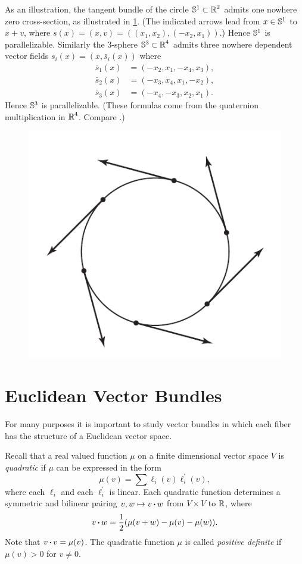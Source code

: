 As an illustration, the tangent bundle of the circle $\mathbb{S}^{1} \subset \boldsymbol{\mathbb{R}}^2$ admits
one nowhere zero cross-section, as illustrated in \cref{fig3}. (The indicated
arrows lead from $x\in\mathbb{S}^{1}$  to $x + v$, where $s(x) =
(x, v) =((x_1,x_2), (-x_2,x_1))$.)
Hence $\mathbb{S}^{1}$  is parallelizable. Similarly the $3$-sphere $\mathbb{S}^{3}\subset\boldsymbol{\mathbb{R}}^4 $ admits
three nowhere dependent vector fields $s_{i}(x)=\left(x, \bar{s}_{i}(x)\right)$ where
\begin{align*}
		\bar{s}_{1}(x)&=\left(-x_{2}, x_{1},-x_{4}, x_{3}\right), \\
		\bar{s}_{2}(x)&=\left(-x_{3}, x_{4}, x_{1},-x_{2}\right), \\
		\bar{s}_{3}(x)&=\left(-x_{4},-x_{3}, x_{2}, x_{1}\right).
\end{align*}
Hence $\mathbb{S}^{3}$ is parallelizable. (These formulas come from the quaternion
multiplication in $\boldsymbol{\mathbb{R}}^4$.
Compare \cite[\S 8.5]{18}.)
\begin{figure}[!htb]
	\centering\includegraphics[scale=.6]{fig3}
	\caption{}\label{fig3}
\end{figure}


\section*{Euclidean Vector Bundles}
For many purposes it is important to study vector bundles in which
each fiber has the structure of a Euclidean vector space.

Recall that a real valued function $\mu$ on a finite dimensional vector
space $V$ is \textit{quadratic} if $\mu$ can be expressed in the form
\[\mu(v)=\sum \ell_{i}(v) \ell_{i}^{\prime}(v),\]
where each $\ell_{i}$ and each $\ell_{i}^{\prime}$ is linear. Each quadratic function determines
a symmetric and bilinear pairing $v, w \mapsto v \operatorname{\boldsymbol{\cdot}}
w$ from $V\times V$ to $\boldsymbol{\mathbb{R}}$, where
\[v \operatorname{\boldsymbol{\cdot}} w=\frac{1}{2}(\mu(v+w)-\mu(v)-\mu(w)).\]
Note that $v \operatorname{\boldsymbol{\cdot}}
v =
\mu(v)$. The quadratic function $\mu$ is called \textit{positive
definite} if $\mu(v) > 0$ for $v\neq 0$.

